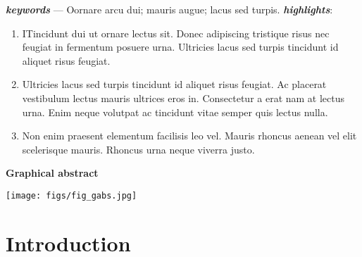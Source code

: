 \documentclass[11pt]{article}
\begin{document}
\begin{adjustwidth}{20pt}{20pt}
\begin{spacing}{0.8}
    \noindent \textit{\textbf{keywords}} --- Oornare arcu dui; mauris augue; lacus sed turpis.
    \newline
    \newline
    \newline
    \noindent \textit{\textbf{highlights}}:
        \begin{enumerate}
            \item ITincidunt dui ut ornare lectus sit. Donec adipiscing tristique risus nec feugiat in fermentum posuere urna. Ultricies lacus sed turpis tincidunt id aliquet risus feugiat. 
            \item Ultricies lacus sed turpis tincidunt id aliquet risus feugiat. Ac placerat vestibulum lectus mauris ultrices eros in. Consectetur a erat nam at lectus urna. Enim neque volutpat ac tincidunt vitae semper quis lectus nulla.
            \item Non enim praesent elementum facilisis leo vel. Mauris rhoncus aenean vel elit scelerisque mauris. Rhoncus urna neque viverra justo. 
        \end{enumerate}
\end{spacing}
\clearpage
\begin{center}
    \vspace{10mm}
    \textsf{\textbf{Graphical abstract}}
    \vspace{5mm}
\end{center}
    
\end{adjustwidth}
    
\begin{center}
    \texttt{[image: figs/fig\_gabs.jpg]}
\end{center}        
\clearpage

\normalsize
\tableofcontents
\clearpage    

\listoffigures
\clearpage	

\linenumbers %
	
\section{Introduction} \label{sec:intro}
\end{document}
